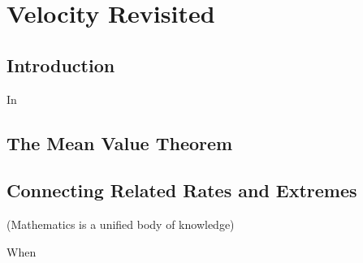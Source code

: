 \section{Velocity Revisited} \label{S:3.6.VelocityRevisited}

\vspace*{-14 pt}

\subsection*{Introduction}

In 



\subsection*{The Mean Value Theorem}

%

\subsection*{Connecting Related Rates and Extremes}

(Mathematics is a unified body of knowledge)

%

%

\begin{summary}
\item When 
\end{summary}

\nin \hrulefill

 

\clearpage
